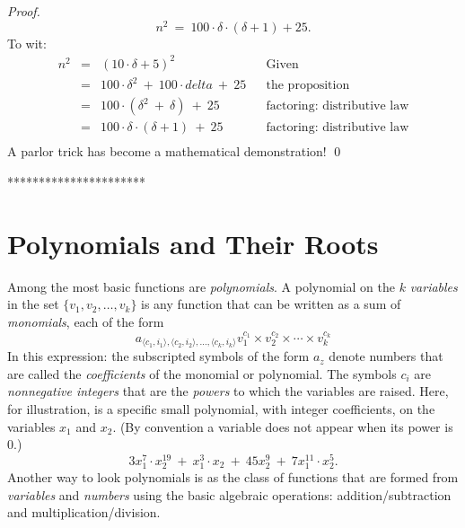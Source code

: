 {\begin{proof}
\[ n^2 \ = \ 100 \cdot \delta \cdot (\delta+1) + 25. \]
To wit: 
\[
\begin{array}{lclll}
n^2 & = & (10 \cdot \delta + 5)^2 & & \mbox{Given} \\
    & = & 100 \cdot \delta^2 \ + \ 100 \cdot delta \ + \ 25
              & & \mbox{the proposition} \\
    & = & 100 \cdot (\delta^2 \ + \ \delta) \ + \ 25
              & & \mbox{factoring: distributive law} \\
    & = & 100 \cdot \delta \cdot (\delta + 1) \ + \ 25
              & & \mbox{factoring: distributive law} \\
\end{array}
\]
A parlor trick has become a mathematical demonstration!
\qed
\end{proof}
**********************}


\section{Polynomials and Their Roots}
\label{sec:polynomials}

Among the most basic functions are {\it polynomials}.
 
A polynomial on the $k$ {\it variables} 
in the set $\{v_1, v_2, \ldots, v_k\}$ is any function that can be
written as a sum of {\it monomials}, 
 
each of the form
\begin{equation}
\label{eq:monomial}
a_{\langle c_1, i_1 \rangle, \langle c_2, i_2 \rangle, \ldots, 
\langle c_k, i_k \rangle} 
v_1^{c_1} \times v_2^{c_2} \times \cdots \times v_k^{c_k}
\end{equation}
In this expression: the subscripted symbols of the form $a_z$ denote
numbers that are called the {\it coefficients}
  of the
monomial or polynomial.  The symbols $c_i$ are {\em nonnegative
  integers} that are the {\it powers} 
 to which the variables are raised.  Here, for
illustration, is a specific small polynomial, with integer
coefficients, on the variables $x_1$ and $x_2$.  (By convention a
variable does not appear when its power is $0$.)
\[ 3 x_1^7 \cdot x_2^{19} \ + \ x_1^3 \cdot x_2 \ + \ 45 x_2^{9} \ + \ 
7 x_1^{11} \cdot x_2^{5}.
\]
Another way to look polynomials is as the class of functions that are
formed from {\it variables} and {\it numbers} using the basic
algebraic operations: addition/subtraction and
multiplication/division.

